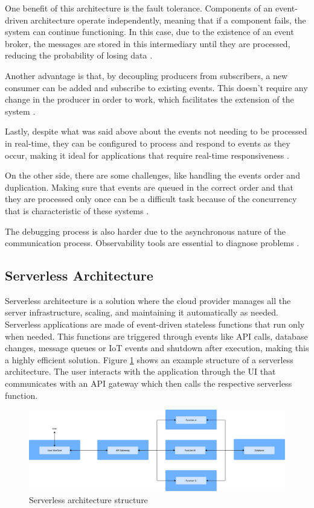 One benefit of this architecture is the fault tolerance.
Components of an event-driven architecture operate independently, meaning
that if a component fails, the system can continue functioning. In this
case, due to the existence of an event broker, the messages are stored in
this intermediary until they are processed, reducing the probability of
losing data \cite{AWSEventDriven}.

Another advantage is that, by decoupling producers from subscribers, a new
consumer can be added and subscribe to existing events. This doesn't require
any change in the producer in order to work, which facilitates the extension of
the system \cite{MicrosoftEventDriven}.

Lastly, despite what was said above about the events not needing to be processed
in real-time, they can be configured to process and respond to events
as they occur, making it ideal for applications that require real-time
responsiveness \cite{manchana2021event}.

On the other side, there are some challenges, like handling the events order and
duplication.
Making sure that events are queued in the correct order and that they are
processed only once can be a difficult task because of the concurrency
that is characteristic of these systems \cite{MicrosoftEventDriven}.

The debugging process is also harder due to the asynchronous nature of the
communication process.
Observability tools are essential to diagnose problems \cite{manchana2021event}.

\subsection{Serverless Architecture}
Serverless architecture is a solution where the cloud provider manages all the
server infrastructure, scaling, and maintaining it automatically as needed.
Serverless applications are made of event-driven stateless functions that run
only when needed. This functions are triggered
through events like \gls{API} calls, database changes, message queues or
\gls{IoT} events and shutdown after execution, making this a highly efficient
solution\cite{s21030928}.
Figure \ref{fig:architectures:serverless}
shows an example structure of a serverless architecture. The user interacts
with the application through the \gls{UI} that communicates with an \gls{API}
gateway which then calls the respective serverless function.

\begin{figure}[htbp]
	\centering
	\includegraphics[width=\textwidth, height=0.5\textheight, keepaspectratio]{Chapters/Figures/Architectures/Serverless.pdf}
	\caption{Serverless architecture structure}
	\label{fig:architectures:serverless}
\end{figure}


